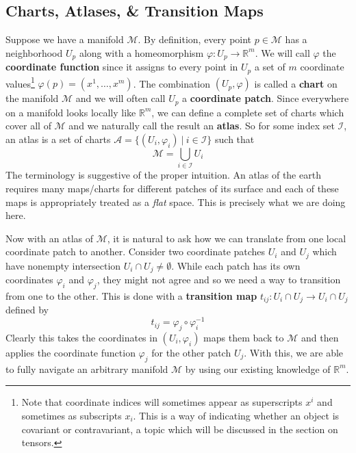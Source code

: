 \documentclass[onecolumn]{gwclass}
\newcommand{\man}{\mathcal{M}}
\newcommand{\R}{\mathbb{R}}
\begin{document}
	\subsection{Charts, Atlases, \& Transition Maps}
	Suppose we have a manifold $\man$. By definition, every point $p\in\man$ has a neighborhood $U_p$ along with a homeomorphism $\varphi:U_p\to\R^m$. We will call $\varphi$ the \textbf{coordinate function} since it assigns to every point in $U_p$ a set of $m$ coordinate values\footnote{Note that coordinate indices will sometimes appear as superscripts $x^i$ and sometimes as subscripts $x_i$. This is a way of indicating whether an object is covariant or contravariant, a topic which will be discussed in the section on tensors. } $\varphi(p)=(x^1,\dots,x^m)$. The combination $(U_p,\varphi)$ is called a \textbf{chart} on the manifold $\man$ and we will often call $U_p$ a \textbf{coordinate patch}. Since everywhere on a manifold looks locally like $\mathbb{R}^m$, we can define a complete set of charts which cover all of $\man$ and we naturally call the result an \textbf{atlas}. So for some index set $\mathcal{I}$, an atlas is a set of charts $\mathcal{A}=\{ (U_i, \varphi_i)\:|\: i\in\mathcal{I} \}$ such that
	$$ \man = \bigcup_{i\in\mathcal{I}} U_i $$
	The terminology is suggestive of the proper intuition. An atlas of the earth requires many maps/charts for different patches of its surface and each of these maps is appropriately treated as a \emph{flat} space. This is precisely what we are doing here.
	
	Now with an atlas of $\man$, it is natural to ask how we can translate from one local coordinate patch to another. Consider two coordinate patches $U_i$ and $U_j$ which have nonempty intersection $U_i \cap U_j \neq \emptyset$. While each patch has its own coordinates $\varphi_i$ and $\varphi_j$, they might not agree and so we need a way to transition from one to the other. This is done with a \textbf{transition map} $t_{ij}: U_i\cap U_j \to U_i\cap U_j $ defined by
	$$ t_{ij} = \varphi_j\circ \varphi_i^{-1} $$
	Clearly this takes the coordinates in $(U_i, \varphi_i)$ maps them back to $\man$ and then applies the coordinate function $\varphi_j$ for the other patch $U_j$. With this, we are able to fully navigate an arbitrary manifold $\man$ by using our existing knowledge of $\R^m$. 
	
\end{document}
